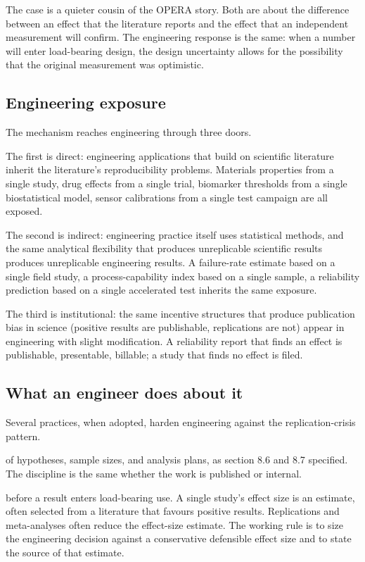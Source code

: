 The case is a quieter cousin of the OPERA story. Both are
about the difference between an effect that the literature
reports and the effect that an independent measurement will
confirm. The engineering response is the same: when a number
will enter load-bearing design, the design uncertainty allows
for the possibility that the original measurement was
optimistic.

\subsection{Engineering exposure}

The mechanism reaches engineering through three doors.

The first is direct: engineering applications that build on
scientific literature inherit the literature's reproducibility
problems. Materials properties from a single study, drug effects
from a single trial, biomarker thresholds from a single biostatistical
model, sensor calibrations from a single test campaign are all
exposed.

The second is indirect: engineering practice itself uses
statistical methods, and the same analytical flexibility that
produces unreplicable scientific results produces unreplicable
engineering results. A failure-rate estimate based on a single
field study, a process-capability index based on a single sample, a
reliability prediction based on a single accelerated test inherits
the same exposure.

The third is institutional: the same incentive structures that
produce publication bias in science (positive results are
publishable, replications are not) appear in engineering with
slight modification. A reliability report that finds an effect is
publishable, presentable, billable; a study that finds no effect is
filed.

\subsection{What an engineer does about it}

Several practices, when adopted, harden engineering against the
replication-crisis pattern.

 of hypotheses, sample sizes, and analysis
plans, as section 8.6 and 8.7 specified. The discipline is the same
whether the work is published or internal.

 before a result enters
load-bearing use. A single study's effect size is an estimate, often
selected from a literature that favours positive results.
Replications and meta-analyses often reduce the effect-size
estimate. The working rule is to size the engineering decision
against a conservative defensible effect size and to state the
source of that estimate.


